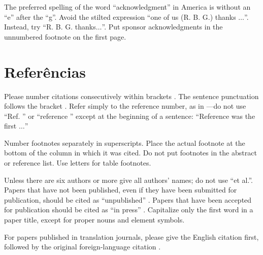 \documentclass[conference]{IEEEtran}
\begin{document}
The preferred spelling of the word ``acknowledgment'' in America is without an ``e'' after the ``g''. Avoid the stilted expression ``one of us (R. B. G.) thanks $\ldots$''. Instead, try ``R. B. G. thanks$\ldots$''. Put sponsor acknowledgments in the unnumbered footnote on the first page.

\section*{Referências}

Please number citations consecutively within brackets \cite{eason1955certain}.
The sentence punctuation follows the bracket \cite{clerk1892maxwell}. Refer simply to the reference number, as in \cite{jacobs1963fine}---do not use ``Ref. \cite{jacobs1963fine}'' or ``reference \cite{jacobs1963fine}'' except at
the beginning of a sentence: ``Reference \cite{jacobs1963fine} was the first $\ldots$''

Number footnotes separately in superscripts. Place the actual footnote at
the bottom of the column in which it was cited. Do not put footnotes in the
abstract or reference list. Use letters for table footnotes.

Unless there are six authors or more give all authors' names; do not use
``et al.''. Papers that have not been published, even if they have been
submitted for publication, should be cited as ``unpublished'' \cite{nicoletitle}. Papers
that have been accepted for publication should be cited as ``in press'' \cite{elissatitle}.
Capitalize only the first word in a paper title, except for proper nouns and
element symbols.

For papers published in translation journals, please give the English
citation first, followed by the original foreign-language citation \cite{yorozu1987electron}.
\end{document}
